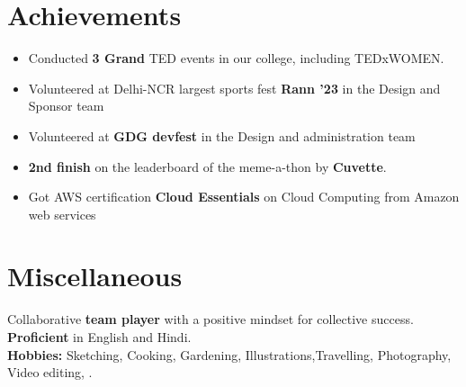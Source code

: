 \documentclass[a4paper,20pt]{article}
\newcommand{\resumeItem}[1]{
  \item\small{
    {#1 \vspace{-2pt}}
  }
}
\newcommand{\resumeItemListStart}{\begin{itemize}}
\newcommand{\resumeItemListEnd}{\end{itemize}\vspace{-5pt}}
\begin{document}
\section{Achievements}
 \begin{itemize}[leftmargin=0.15in, label={}]
    \resumeItemListStart
        \resumeItem{Conducted \textbf{3 Grand} TED events in our college, including TEDxWOMEN.}
        \resumeItem{Volunteered at Delhi-NCR largest sports fest \textbf{Rann '23} in the Design and Sponsor team} 
        \resumeItem{Volunteered at \textbf{GDG  devfest} in the Design and administration team} 
        \resumeItem{\textbf{2nd finish } on the leaderboard of the meme-a-thon by \textbf{Cuvette}.}
        \resumeItem{Got AWS certification \textbf{Cloud Essentials} on Cloud Computing from Amazon web services}
      \resumeItemListEnd
 \end{itemize}
 \vspace{-18pt}

%
 
 \section{Miscellaneous}
  \begin{itemize}[leftmargin=0.15in, label={}]
     \small{\item{
      {Collaborative \textbf{team player} with a positive mindset for collective success.} \\
      {\textbf{Proficient} in English and Hindi.} \\
      {\textbf{Hobbies:} Sketching, Cooking, Gardening, Illustrations,Travelling, Photography, Video editing, .} \\
     }}
  \end{itemize}
  \vspace{-16pt}
\end{document}
